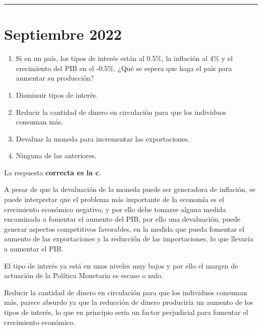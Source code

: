 \documentclass[
  letterpaper,
  DIV=11,
  numbers=noendperiod]{scrreprt}
\providecommand{\tightlist}{%
  \setlength{\itemsep}{0pt}\setlength{\parskip}{0pt}}\usepackage{longtable,booktabs,array}
\begin{document}
\begin{center}\rule{0.5\linewidth}{0.5pt}\end{center}

\hypertarget{septiembre-2022}{%
\chapter*{Septiembre 2022}\label{septiembre-2022}}


\begin{enumerate}
\def\labelenumi{\arabic{enumi}.}
\tightlist
\item
  Si en un país, los tipos de interés están al 0.5\%, la inflación al
  4\% y el crecimiento del PIB en el -0.5\%. ¿Qué se espera que haga el
  país para aumentar su producción?
\end{enumerate}

\begin{enumerate}
\def\labelenumi{\alph{enumi})}
\item
  Disminuir tipos de interés.
\item
  Reducir la cantidad de dinero en circulación para que los individuos
  consuman más.
\item
  Devaluar la moneda para incrementar las exportaciones.
\item
  Ninguna de las anteriores.
\end{enumerate}

\begin{tcolorbox}[enhanced jigsaw, opacityback=0, bottomrule=.15mm, colframe=quarto-callout-tip-color-frame, arc=.35mm, leftrule=.75mm, breakable, colback=white, rightrule=.15mm, toprule=.15mm, left=2mm]
\begin{minipage}[t]{5.5mm}
\textcolor{quarto-callout-tip-color}{\faLightbulb}
\end{minipage}%
\begin{minipage}[t]{\textwidth - 5.5mm}

La respuesta \textbf{correcta es la c}.

A pesar de que la devaluación de la moneda puede ser generadora de
inflación, se puede interpretar que el problema más importante de la
economía es el crecimiento económico negativo, y por ello debe tomarse
alguna medida encaminada a fomentar el aumento del PIB, por ello una
devaluación, puede generar aspectos competitivos favorables, en la
medida que pueda fomentar el aumento de las exportaciones y la reducción
de las importaciones, lo que llevaría a aumentar el PIB.

El tipo de interés ya está en unos niveles muy bajos y por ello el
margen de actuación de la Política Monetaria es escaso o nulo.

Reducir la cantidad de dinero en circulación para que los individuos
consuman más, parece absurdo ya que la reducción de dinero produciría un
aumento de los tipos de interés, lo que en principio sería un factor
perjudicial para fomentar el crecimiento económico.

\end{minipage}%
\end{tcolorbox}
\end{document}
